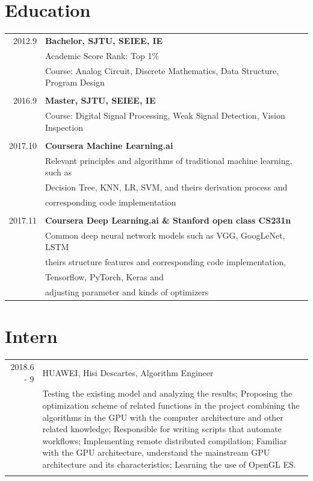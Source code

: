 \documentclass[a4paper,11pt]{article}
\begin{document}
\section{Education}
\begin{tabular}{rl}
\textsc{2012.9} & \bf{Bachelor, SJTU, SEIEE, IE}\\
& Academic Score Rank: Top 1\%\\
& Course: Analog Circuit, Discrete Mathematics, Data Structure, Program Design\\&\\
\textsc{2016.9} & \bf{Master, SJTU, SEIEE, IE}\\
& Course: Digital Signal Processing, Weak Signal Detection, Vision Inspection\\&\\
\textsc{2017.10} & \bf{Coursera Machine Learning.ai}\\
& Relevant principles and algorithms of traditional machine learning, such as\\
& Decision Tree, KNN, LR, SVM, and theirs derivation process and\\
& corresponding code implementation\\&\\
\textsc{2017.11} & \bf{Coursera Deep Learning.ai \& Stanford open class CS231n}\\
& Common deep neural network models such as VGG, GoogLeNet, LSTM\\
& theirs structure features and corresponding code implementation,\\ 
& Tensorflow, PyTorch, Keras and\\
& adjusting parameter and kinds of optimizers
\end{tabular}

\section{Intern}
\begin{tabular}{r|p{11cm}}
 \textsc{2018.6 - 9} & HUAWEI, Hisi Descartes, Algorithm Engineer \\&\footnotesize{Testing the existing model and analyzing the results; Proposing the optimization scheme of related functions in the project combining the algorithms in the GPU with the computer architecture and other related knowledge; Responsible for writing scripts that automate workflows; Implementing remote distributed compilation; Familiar with the GPU architecture, understand the mainstream GPU architecture and its characteristics; Learning the use of OpenGL ES.}\\\multicolumn{2}{c}{} \\
\end{tabular}
\end{document}
